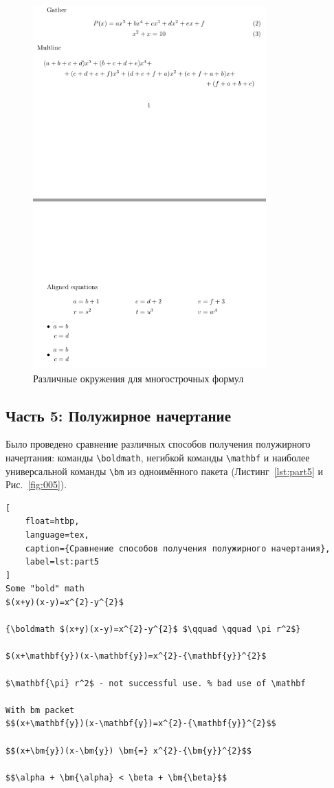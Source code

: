 \documentclass[a4paper, 12pt]{article}
\renewcommand{\figurename}{Рис.}
\renewcommand{\lstlistingname}{Листинг}
\begin{document}
\begin{figure}[H]
    \centering
    \includegraphics[width=0.8\textwidth]{image/4.png}
    \caption{Различные окружения для многострочных формул}
    \label{fig:004}
\end{figure}

\subsection{Часть 5: Полужирное начертание}
Было проведено сравнение различных способов получения полужирного начертания: команды \texttt{\textbackslash boldmath}, негибкой команды \texttt{\textbackslash mathbf} и наиболее универсальной команды \texttt{\textbackslash bm} из одноимённого пакета (\lstlistingname~\ref{lst:part5} и \figurename~\ref{fig:005}).

\begin{lstlisting}[
    float=htbp, 
    language=tex,
    caption={Сравнение способов получения полужирного начертания}, 
    label=lst:part5
]
Some "bold" math
$(x+y)(x-y)=x^{2}-y^{2}$

{\boldmath $(x+y)(x-y)=x^{2}-y^{2}$ $\qquad \qquad \pi r^2$}

$(x+\mathbf{y})(x-\mathbf{y})=x^{2}-{\mathbf{y}}^{2}$

$\mathbf{\pi} r^2$ - not successful use. % bad use of \mathbf

With bm packet
$$(x+\mathbf{y})(x-\mathbf{y})=x^{2}-{\mathbf{y}}^{2}$$

$$(x+\bm{y})(x-\bm{y}) \bm{=} x^{2}-{\bm{y}}^{2}$$

$$\alpha + \bm{\alpha} < \beta + \bm{\beta}$$
\end{lstlisting}
\end{document}
